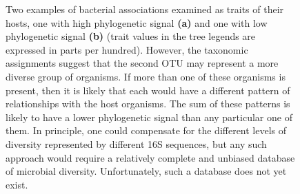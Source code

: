 \begin{figure}
    \caption{Two examples of bacterial associations examined as traits of their hosts, one with high phylogenetic signal \textbf{(a)} and one with low phylogenetic signal \textbf{(b)} (trait values in the tree legends are expressed in parts per hundred). However, the taxonomic assignments suggest that the second OTU may represent a more diverse group of organisms. If more than one of these organisms is present, then it is likely that each would have a different pattern of relationships with the host organisms. The sum of these patterns is likely to have a lower phylogenetic signal than any particular one of them. In principle, one could compensate for the different levels of diversity represented by different 16S sequences, but any such approach would require a relatively complete and unbiased database of microbial diversity. Unfortunately, such a database does not yet exist.}
    \label{fig:FP_fig4}
\end{figure}